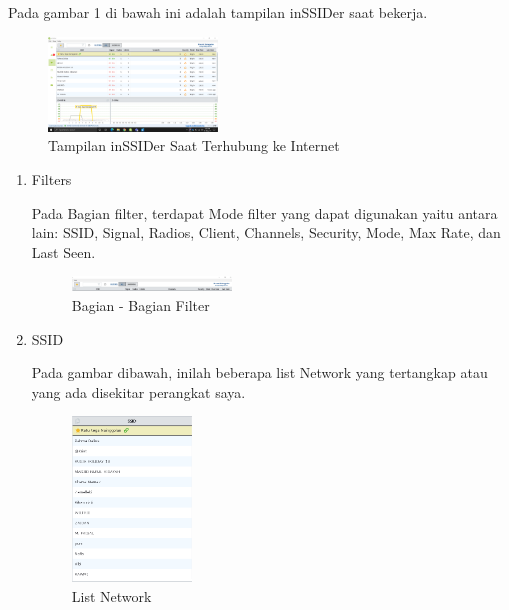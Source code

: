 \documentclass[conference]{IEEEtran}
\begin{document}
\vspace{0.3cm}
Pada gambar 1 di bawah ini adalah tampilan inSSIDer saat bekerja.

\begin{figure}[h]
	\centering
	\includegraphics[width=0.4\textwidth]{2.png}
	\caption{Tampilan inSSIDer Saat Terhubung ke Internet}
\end{figure}

\begin{enumerate}
    \item Filters
    \vspace{0.2cm}
    
    Pada Bagian filter, terdapat Mode filter yang dapat
    digunakan yaitu antara lain: SSID, Signal, Radios, Client, Channels, Security, Mode, Max Rate, dan Last Seen.
    
    \begin{figure}[h]
        \centering
        \includegraphics[width=0.4\textwidth]{3.png}
        \caption{Bagian - Bagian Filter}
    \end{figure}
    
    \vspace{0.2cm}
    
    \item SSID
    \vspace{0.2cm}
    
    Pada gambar dibawah, inilah beberapa list Network yang tertangkap atau yang ada disekitar perangkat saya.
    
    \begin{figure}[h]
        \centering
        \includegraphics[width=0.3\textwidth]{4.png}
        \caption{List Network}
    \end{figure}
    \vspace{0.2cm}
    

\end{enumerate}
\end{document}
